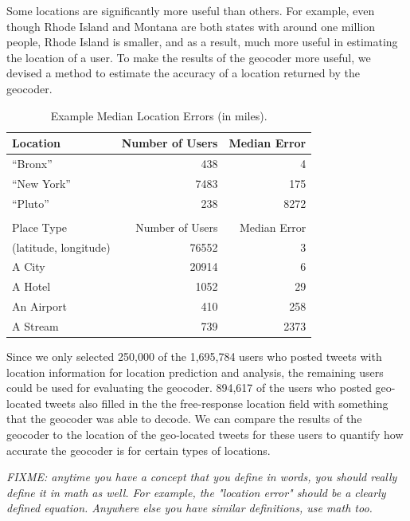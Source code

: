 Some locations are significantly more useful than others.
For example, even though Rhode Island and Montana are both states with around
one million people, Rhode Island is smaller, and as a result, much more useful
in estimating the location of a user.
To make the results of the geocoder more useful, we devised a method to
estimate the accuracy of a location returned by the geocoder.

\begin{table}[tb]
\centering
\caption{Example Median Location Errors (in miles).}
\begin{tabular}{l r r}
Location&Number of Users&Median Error\\ \hline
``Bronx''&438&4\\
``New York''&7483&175\\
``Pluto''&238&8272\\ \hline
\\
Place Type&Number of Users&Median Error\\ \hline
(latitude, longitude)&76552&3\\
A City&20914&6\\
A Hotel&1052&29\\
An Airport&410&258\\
A Stream&739&2373\\
\hline\end{tabular}
\label{tab:MedianLocErr}
\end{table}

Since we only selected 250,000 of the 1,695,784 users who posted tweets with
location information for location prediction and analysis, the remaining users
could be used for evaluating the geocoder.
%
894,617 of the users who posted geo-located tweets also filled in the
the free-response location field with something that the geocoder was able to
decode.
%
We can compare the results of the geocoder to the location of the geo-located
tweets for these users to quantify how accurate the geocoder is for certain
types of locations.

\emph{FIXME: anytime you have a concept that you define in words, you should
    really define it in math as well. For example, the "location error" should
    be a clearly defined equation. Anywhere else you have similar definitions,
    use math too.
}

